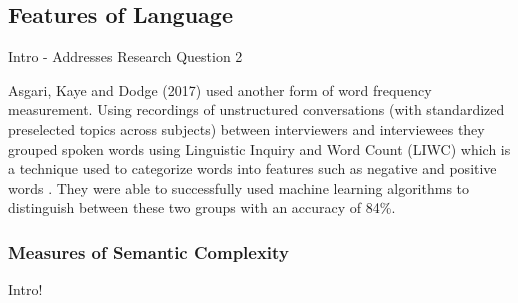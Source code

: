 \documentclass[12pt]{article}
\begin{document}
\subsection{Features of Language}
Intro - Addresses Research Question 2

\par
Asgari, Kaye and Dodge (2017) \cite{Asgari2017} used another form of word frequency measurement. Using recordings of unstructured conversations (with standardized preselected topics across subjects) between interviewers and interviewees they grouped spoken words using Linguistic Inquiry and Word Count (LIWC) which is a technique used to categorize words into features such as negative and positive words \cite{Pennebaker2015}. They were able to successfully used machine learning algorithms to distinguish between these two groups with an accuracy of 84\%.
\subsubsection{Measures of Semantic Complexity}
Intro!
\end{document}
